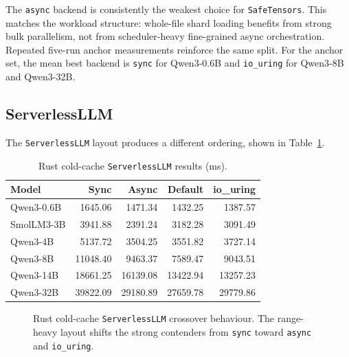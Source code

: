 The \texttt{async} backend is consistently the weakest choice for \texttt{SafeTensors}. This matches the workload structure: whole-file shard loading benefits from strong bulk parallelism, not from scheduler-heavy fine-grained async orchestration. Repeated five-run anchor measurements reinforce the same split. For the anchor set, the mean best backend is \texttt{sync} for Qwen3-0.6B and \texttt{io\_uring} for Qwen3-8B and Qwen3-32B.

\subsection{ServerlessLLM}

The \texttt{ServerlessLLM} layout produces a different ordering, shown in Table~\ref{tab:rust-serverlessllm}.

\begin{table}[h]
\caption{Rust cold-cache \texttt{ServerlessLLM} results (ms).}
\label{tab:rust-serverlessllm}
\centering
\begin{tabular}{lrrrr}
\toprule
Model & Sync & Async & Default & io\_uring \\
\midrule
Qwen3-0.6B & 1645.06 & 1471.34 & 1432.25 & 1387.57 \\
SmolLM3-3B & 3941.88 & 2391.24 & 3182.28 & 3091.49 \\
Qwen3-4B & 5137.72 & 3504.25 & 3551.82 & 3727.14 \\
Qwen3-8B & 11048.40 & 9463.37 & 7589.47 & 9043.51 \\
Qwen3-14B & 18661.25 & 16139.08 & 13422.94 & 13257.23 \\
Qwen3-32B & 39822.09 & 29180.89 & 27659.78 & 29779.86 \\
\bottomrule
\end{tabular}
\end{table}

\begin{figure}[h]
\centering
{}
\caption{Rust cold-cache \texttt{ServerlessLLM} crossover behaviour. The range-heavy layout shifts the strong contenders from \texttt{sync} toward \texttt{async} and \texttt{io\_uring}.}
\label{fig:rust-serverless-crossover}
\end{figure}

